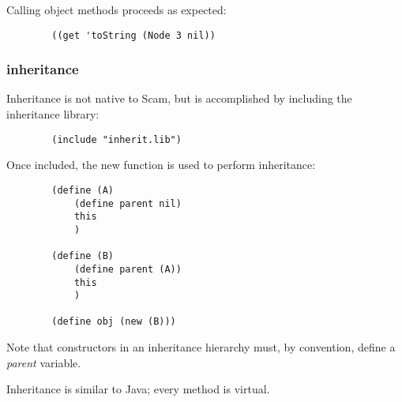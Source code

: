\documentclass{article}
\begin{document}
    Calling object methods proceeds as expected:

\begin{verbatim}
        ((get 'toString (Node 3 nil))
\end{verbatim}


\subsubsection*{inheritance}

    Inheritance is not native to Scam, but is accomplished by 
    including the inheritance library:
    
\begin{verbatim}
        (include "inherit.lib")
\end{verbatim}

     Once included, the new function is used to perform
     inheritance:

\begin{verbatim}
        (define (A)
            (define parent nil)
            this
            )

        (define (B)
            (define parent (A))
            this
            )
    
        (define obj (new (B)))
\end{verbatim}

    Note that constructors in an inheritance hierarchy must, by
    convention, define a {\it parent} variable.

    Inheritance is similar to Java; every method is virtual.
\end{document}
